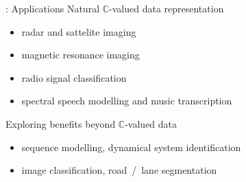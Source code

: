 \documentclass{beamer}
\newcommand{\cplx}{\mathbb{C}}
\begin{document}
\begin{frame}[c]{\insertsection: Applications}
  Natural $\cplx$-valued data representation
  \begin{itemize}
    \smallskip
    \item radar and sattelite imaging
      {\tiny \\ \quad
        \citep{hirose_complex-valued_2009,hansch_complex-valued_2010,zhang_complex-valued_2017}}
    \smallskip
    \item magnetic resonance imaging
      {\tiny \\ \quad
        \citep{hui_mri_1995,wang_deepcomplexmri_2020}}
    \smallskip
    \item radio signal classification
      {\tiny \\ \quad
        \citep{yang_complex_2019,tarver_design_2019}}
    \smallskip
    \item spectral speech modelling and music transcription
      {\tiny \\ \quad
        \citep{wisdom_full-capacity_2016,trabelsi_deep_2018,yang_complex_2019}}
  \end{itemize}
  \medskip
  Exploring benefits beyond $\cplx$-valued data
  \begin{itemize}
    \item sequence modelling, dynamical system identification
      {\tiny \\ \quad
        \citep{danihelka_associative_2016,wisdom_full-capacity_2016}}
    \smallskip
    \item image classification, road~/~lane segmentation  %
      {\tiny \\ \quad
        \citep{popa_complex-valued_2017,trabelsi_deep_2018,gaudet_deep_2018}}
  \end{itemize}
\end{frame}
\end{document}
